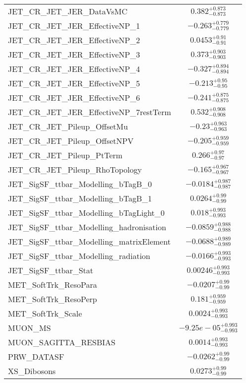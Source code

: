 \begin{tabular}{|l|c|}
JET\_CR\_JET\_JER\_DataVsMC & $0.382^{+0.873}_{-0.873}$ \\
JET\_CR\_JET\_JER\_EffectiveNP\_1 & $-0.263^{+0.779}_{-0.779}$ \\
JET\_CR\_JET\_JER\_EffectiveNP\_2 & $0.0453^{+0.91}_{-0.91}$ \\
JET\_CR\_JET\_JER\_EffectiveNP\_3 & $0.373^{+0.903}_{-0.903}$ \\
JET\_CR\_JET\_JER\_EffectiveNP\_4 & $-0.327^{+0.894}_{-0.894}$ \\
JET\_CR\_JET\_JER\_EffectiveNP\_5 & $-0.213^{+0.95}_{-0.95}$ \\
JET\_CR\_JET\_JER\_EffectiveNP\_6 & $-0.241^{+0.875}_{-0.875}$ \\
JET\_CR\_JET\_JER\_EffectiveNP\_7restTerm & $0.532^{+0.908}_{-0.908}$ \\
JET\_CR\_JET\_Pileup\_OffsetMu & $-0.23^{+0.963}_{-0.963}$ \\
JET\_CR\_JET\_Pileup\_OffsetNPV & $-0.205^{+0.959}_{-0.959}$ \\
JET\_CR\_JET\_Pileup\_PtTerm & $0.266^{+0.97}_{-0.97}$ \\
JET\_CR\_JET\_Pileup\_RhoTopology & $-0.165^{+0.967}_{-0.967}$ \\
JET\_SigSF\_ttbar\_Modelling\_bTagB\_0 & $-0.0184^{+0.987}_{-0.987}$ \\
JET\_SigSF\_ttbar\_Modelling\_bTagB\_1 & $0.0264^{+0.99}_{-0.99}$ \\
JET\_SigSF\_ttbar\_Modelling\_bTagLight\_0 & $0.018^{+0.993}_{-0.993}$ \\
JET\_SigSF\_ttbar\_Modelling\_hadronisation & $-0.0859^{+0.988}_{-0.988}$ \\
JET\_SigSF\_ttbar\_Modelling\_matrixElement & $-0.0688^{+0.989}_{-0.989}$ \\
JET\_SigSF\_ttbar\_Modelling\_radiation & $-0.0166^{+0.993}_{-0.993}$ \\
JET\_SigSF\_ttbar\_Stat & $0.00246^{+0.993}_{-0.993}$ \\
MET\_SoftTrk\_ResoPara & $-0.0207^{+0.99}_{-0.99}$ \\
MET\_SoftTrk\_ResoPerp & $0.181^{+0.959}_{-0.959}$ \\
MET\_SoftTrk\_Scale & $0.0024^{+0.993}_{-0.993}$ \\
MUON\_MS & $-9.25e-05^{+0.993}_{-0.993}$ \\
MUON\_SAGITTA\_RESBIAS & $0.0014^{+0.993}_{-0.993}$ \\
PRW\_DATASF & $-0.0262^{+0.99}_{-0.99}$ \\
XS\_Dibosons & $0.0273^{+0.99}_{-0.99}$ \\

\end{tabular}
